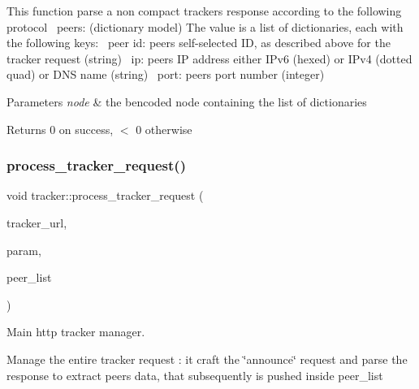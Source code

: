 This function parse a non compact tracker\textquotesingle{}s response according to the following protocol~\newline
 peers\+: (dictionary model) The value is a list of dictionaries, each with the following keys\+:~\newline
peer id\+: peer\textquotesingle{}s self-\/selected ID, as described above for the tracker request (string)~\newline
ip\+: peer\textquotesingle{}s IP address either I\+Pv6 (hexed) or I\+Pv4 (dotted quad) or D\+NS name (string)~\newline
port\+: peer\textquotesingle{}s port number (integer)~\newline
 
\begin{DoxyParams}{Parameters}
{\em node} & the bencoded node containing the list of dictionaries\\
\hline
\end{DoxyParams}
\begin{DoxyReturn}{Returns}
0 on success, $<$ 0 otherwise 
\end{DoxyReturn}
\mbox{\label{namespacetracker_ab13f3471f16db9505c2853f4e1bde3aa}} 
\subsubsection{\texorpdfstring{process\+\_\+tracker\+\_\+request()}{process\_tracker\_request()}}
{\footnotesize\ttfamily void tracker\+::process\+\_\+tracker\+\_\+request (\begin{DoxyParamCaption}\item[{const string \&}]{tracker\+\_\+url,  }\item[{const \hyperlink{structtracker_1_1TParameter}{T\+Parameter} $\ast$}]{param,  }\item[{pwp\+::\+Peer\+List}]{peer\+\_\+list }\end{DoxyParamCaption})}



Main http tracker manager. 

Manage the entire tracker request \+: it craft the \char`\"{}announce\char`\"{} request and parse the response to extract peers data, that subsequently is pushed inside peer\+\_\+list


